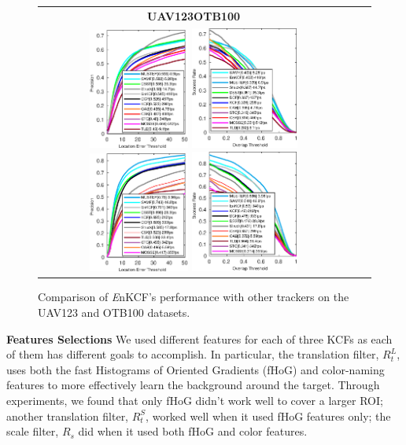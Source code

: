 \documentclass[10pt,twocolumn,letterpaper]{article}
\begin{document}
\begin{figure}[h]
\centering
\begin{tabular}{ccc}
\tiny\quad\quad\textbf{UAV123}\hspace{.37\linewidth}\textbf{OTB100}\\
\includegraphics[width=3.30cm]{./figures/pr_uav123.eps}
\includegraphics[width=3.55cm]{./figures/sr_uav123.eps}
\includegraphics[width=3.30cm]{./figures/pr_otb100.eps}
\includegraphics[width=3.55cm]{./figures/sr_otb100.eps}\\
\end{tabular}
\caption{Comparison of {\it E}nKCF's performance with other trackers on the UAV123 and OTB100 datasets.}
\label{fig:UAV123_DATASET}
\end{figure}

\textbf{Features Selections} We used different features for each of
three KCFs as each of them has different goals to accomplish. In
particular, the translation filter, $R_{t}^{L}$, uses both the fast
Histograms of Oriented Gradients (fHoG) \cite{felzenszwalb2010object}
and color-naming \cite{van2009learning} features to more effectively
learn the background around the target. Through experiments, we found
that only fHoG didn't work well to cover a larger ROI; another
translation filter, $R_{t}^{S}$, worked well when it used fHoG
features only; the scale filter, $R_{s}$ did when it used both fHoG
and color features.
\end{document}
